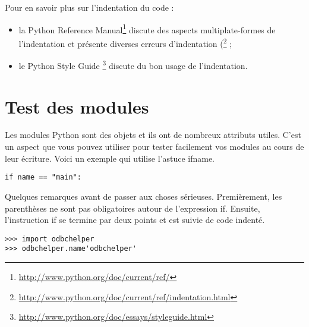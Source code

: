 \medskip
\noindent Pour en savoir plus sur l'indentation du code :
\begin{itemize}
    \item la Python Reference Manual\footnote{\url{http://www.python.org/doc/current/ref/}} discute des aspects multiplate-formes de l'indentation et présente diverses erreurs d'indentation (\footnote{\url{http://www.python.org/doc/current/ref/indentation.html}} ;
    \item le Python Style Guide \footnote{\url{http://www.python.org/doc/essays/styleguide.html}} discute du bon usage de l'indentation.
\end{itemize}

\section{Test des modules}

Les modules Python sont des objets et ils ont de nombreux attributs utiles. C'est un aspect que vous pouvez utiliser pour tester facilement vos modules au cours de leur écriture. Voici un exemple qui utilise l'astuce ifname.

\begin{lstlisting}
if name == "main":
\end{lstlisting}

Quelques remarques avant de passer aux choses sérieuses. Premièrement, les parenthèses ne sont pas obligatoires autour de l'expression if. Ensuite, l'instruction if se termine par deux points et est suivie de code indenté.


\begin{lstlisting}
>>> import odbchelper
>>> odbchelper.name'odbchelper'
\end{lstlisting}

